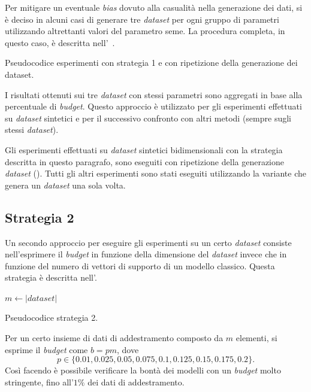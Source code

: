 Per mitigare un eventuale \emph{bias} dovuto alla casualità nella generazione dei dati, si è deciso in alcuni casi di generare tre \emph{dataset} per ogni gruppo di parametri utilizzando altrettanti valori del parametro seme.
La procedura completa, in questo caso, è descritta nell'~.
\begin{algorithm}[t]
    \SetAlgoLined
\caption{Pseudocodice esperimenti con strategia 1 e con ripetizione della generazione dei dataset.}
\label{alg:esperimenti_2}
\end{algorithm}
I risultati ottenuti sui tre \emph{dataset} con stessi parametri sono aggregati in base alla percentuale di \emph{budget}.
Questo approccio è utilizzato per gli esperimenti effettuati su \emph{dataset} sintetici e per il successivo confronto con altri metodi (sempre sugli stessi \emph{dataset}).

Gli esperimenti effettuati su \emph{dataset} sintetici bidimensionali con la strategia descritta in questo paragrafo, sono eseguiti con ripetizione della generazione \emph{dataset} (). Tutti gli altri esperimenti sono stati eseguiti utilizzando la variante che genera un \emph{dataset} una sola volta.

\subsection{Strategia 2}
Un secondo approccio per eseguire gli esperimenti su un certo \emph{dataset} consiste nell'esprimere il \emph{budget} in funzione della dimensione del \emph{dataset} invece che in funzione del numero di vettori di supporto di un modello classico.
Questa strategia è descritta nell'.
\begin{algorithm}
    \SetAlgoLined
    $m \gets |\textit{dataset}|$\;
\caption{Pseudocodice strategia 2.}
\label{alg:esperimenti_3}
\end{algorithm}
Per un certo insieme di dati di addestramento composto da $m$ elementi, si esprime il \emph{budget} come $b=pm$, dove
\begin{equation*}
    p\in\{0.01, 0.025, 0.05, 0.075, 0.1, 0.125, 0.15, 0.175, 0.2\}.
\end{equation*}
Così facendo è possibile verificare la bontà dei modelli con un \emph{budget} molto stringente, fino all'$1\%$ dei dati di addestramento.

